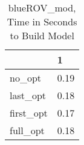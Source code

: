 \begin{table}
\caption{blueROV\_mod, Time in Seconds to Build Model}
\label{blueROV_mod_model_time}
\begin{tabular}{ll}
\toprule
 & 1 \\
\midrule
no\_opt & 0.19 \\
last\_opt & 0.18 \\
first\_opt & 0.17 \\
full\_opt & 0.18 \\
\bottomrule
\end{tabular}
\end{table}
